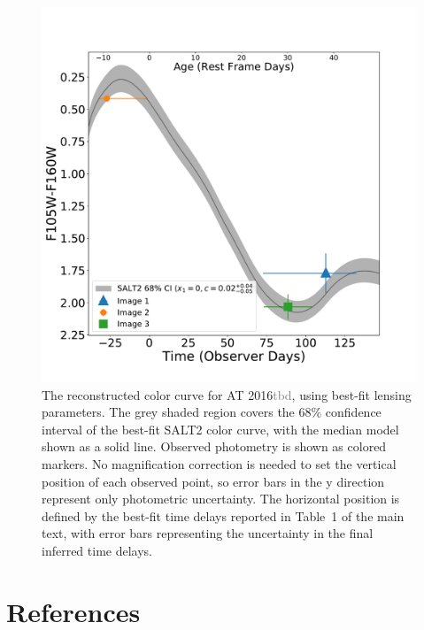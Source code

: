 \documentclass[12pt,dvipsnames]{article}
\def\SNABC{AT 2016{\textcolor{Gray}{tbd}}\xspace}
\begin{document}
\begin{figure}[h!]
    \centering
    \includegraphics[width=\textwidth]{Paper/Figures/full_colorcurve_total.pdf}
    \caption{\label{fig:full_colorcurve} The reconstructed color curve for \SNABC, using best-fit lensing parameters. The grey shaded region covers the 68\% confidence interval of the best-fit SALT2 color curve, with the median model shown as a solid line. Observed photometry is shown as colored markers.  No magnification correction is needed to set the vertical position of each observed point, so error bars in the y direction represent only photometric uncertainty. The horizontal position is defined by the best-fit time delays reported in Table~1 of the main text, with error bars 
    representing the uncertainty in the final inferred time delays. }
\end{figure}
\clearpage
\section*{References}
\end{document}
